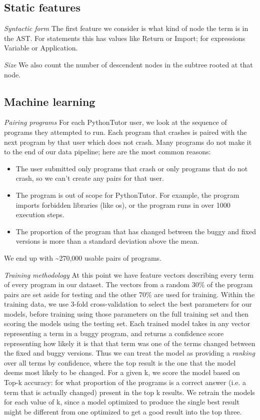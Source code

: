\documentclass[conference]{IEEEtran}
\begin{document}
\subsection{Static features}

\emph{Syntactic form} The first feature we consider is what kind of node the term
is in the AST. For statements this has values like Return or Import; for expressions
Variable or Application.

\emph{Size} We also count the number of descendent nodes in the subtree rooted at that node.

\subsection{Machine learning}

\emph{Pairing programs} For each PythonTutor user, we look at the sequence of
programs they attempted to run. Each program that crashes is paired with the next
program by that user which does not crash. Many programs do not make it to the
end of our data pipeline; here are the most common reasons:
\begin{itemize}
    \item The user submitted only programs that crash or only programs that do
    not crash, so we can't create any pairs for that user.
    \item The program is out of scope for PythonTutor. For
    example, the program imports forbidden libraries (like os), or the program
    runs in over 1000 execution steps.
    \item The proportion of the program that has changed between the buggy and
    fixed versions is more than a standard deviation above the mean.
\end{itemize}
We end up with \textasciitilde270,000 usable pairs of programs.

\emph{Training methodology} At this point we have feature vectors describing every term of every program in
our dataset. The vectors from a random 30\% of the program pairs are set aside for testing and
the other 70\% are used for training. Within the training data, we use 3-fold
cross-validation to select the best parameters for our models, before training
using those parameters on the full training set and then scoring the models
using the testing set. Each trained model takes in any vector representing a term
in a buggy program, and returns a confidence score representing how likely it is that
that term was one of the terms changed between the fixed and buggy versions.
Thus we can treat the model as providing a \emph{ranking} over all terms by
confidence, where the top result is the one that the model deems most likely
to be changed. For
a given k, we score the model based on Top-k accuracy: for what proportion of the
programs is a correct answer (i.e. a term that is actually changed) present in the
top k results. We retrain the models for each value of k, since a model optimized
to produce the single best result might be different from one optimized to get a
good result into the top three.
\end{document}
